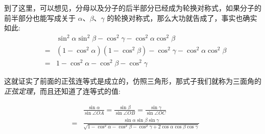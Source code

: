 到了这里，可以想见，分母以及分子的后半部分已经成为轮换对称式，如果分子的前半部分也能写成关于 $\alpha$、$\beta$、$\gamma$ 的轮换对称式，那么大功就告成了，事实也确实如此:
\begin{eqnarray*}
  && \sin^2{\alpha}\sin^2{\beta}-\cos^2{\gamma}-\cos^2{\alpha}\cos^2{\beta} \\
  & = & (1-\cos^2{\alpha})(1-\cos^2{\beta})-\cos^2{\gamma}-\cos^2{\alpha}\cos^2{\beta} \\
   & = & 1-\cos^2{\alpha}-\cos^2{\beta}-\cos^2{\gamma}
\end{eqnarray*}

这就证实了前面的正弦连等式是成立的，仿照三角形，那式子我们就称为三面角的 \emph{正弦定理}，而且还知道了连等式的值:

\begin{eqnarray*}
  && \frac{\sin{\alpha}}{\sin{\angle OA}} = \frac{\sin{\beta}}{\sin{\angle OB}} = \frac{\sin{\gamma}}{\sin{\angle OC}} \\
  & = & \frac{\sin{\alpha}\sin{\beta}\sin{\gamma}}{\sqrt{1-\cos^2{\alpha}-\cos^2{\beta}-\cos^2{\gamma}+2\cos{\alpha}\cos{\beta}\cos{\gamma}}}
\end{eqnarray*}

